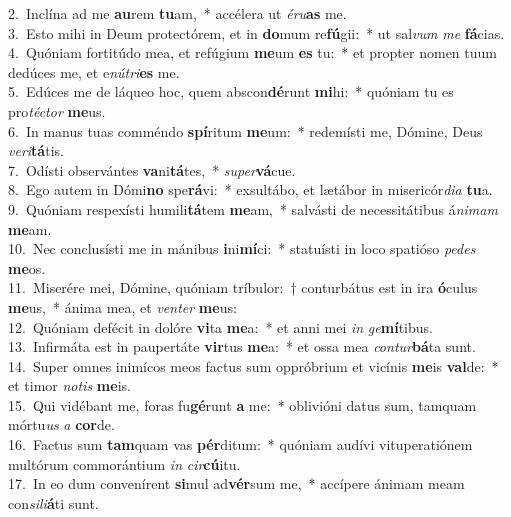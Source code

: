 {2.~}Inclína ad me \textbf{au}rem \textbf{tu}am,~* accélera ut \textit{é}\textit{ru}\textbf{as} me.\\
{3.~}Esto mihi in Deum protectórem, et in \textbf{do}mum re\textbf{fú}gii:~* ut sal\textit{vum} \textit{me} \textbf{fá}cias.\\
{4.~}Quóniam fortitúdo mea, et refúgium \textbf{me}um \textbf{es} tu:~* et propter nomen tuum dedúces me, et e\textit{nú}\textit{tri}\textbf{es} me.\\
{5.~}Edúces me de láqueo hoc, quem abscon\textbf{dé}runt \textbf{mi}hi:~* quóniam tu es pro\textit{té}\textit{ctor} \textbf{me}us.\\
{6.~}In manus tuas comméndo \textbf{spí}ritum \textbf{me}um:~* redemísti me, Dómine, Deus \textit{ve}\textit{ri}\textbf{tá}tis.\\
{7.~}Odísti observántes \textbf{va}ni\textbf{tá}tes,~* \textit{su}\textit{per}\textbf{vá}cue.\\
{8.~}Ego autem in Dómi\textbf{no} spe\textbf{rá}vi:~* exsultábo, et lætábor in misericór\textit{di}\textit{a} \textbf{tu}a.\\
{9.~}Quóniam respexísti humili\textbf{tá}tem \textbf{me}am,~* salvásti de necessitátibus á\textit{ni}\textit{mam} \textbf{me}am.\\
{10.~}Nec conclusísti me in mánibus \textbf{i}ni\textbf{mí}ci:~* statuísti in loco spatióso \textit{pe}\textit{des} \textbf{me}os.\\
{11.~}Miserére mei, Dómine, quóniam tríbulor:~† conturbátus est in ira \textbf{ó}culus \textbf{me}us,~* ánima mea, et \textit{ven}\textit{ter} \textbf{me}us:\\
{12.~}Quóniam defécit in dolóre \textbf{vi}ta \textbf{me}a:~* et anni mei \textit{in} \textit{ge}\textbf{mí}tibus.\\
{13.~}Infirmáta est in paupertáte \textbf{vir}tus \textbf{me}a:~* et ossa mea \textit{con}\textit{tur}\textbf{bá}ta sunt.\\
{14.~}Super omnes inimícos meos factus sum oppróbrium et vicínis \textbf{me}is \textbf{val}de:~* et timor \textit{no}\textit{tis} \textbf{me}is.\\
{15.~}Qui vidébant me, foras fu\textbf{gé}runt \textbf{a} me:~* oblivióni datus sum, tamquam mórtu\textit{us} \textit{a} \textbf{cor}de.\\
{16.~}Factus sum \textbf{tam}quam vas \textbf{pér}ditum:~* quóniam audívi vituperatiónem multórum commorántium \textit{in} \textit{cir}\textbf{cú}itu.\\
{17.~}In eo dum convenírent \textbf{si}mul ad\textbf{vér}sum me,~* accípere ánimam meam con\textit{si}\textit{li}\textbf{á}ti sunt.\\
